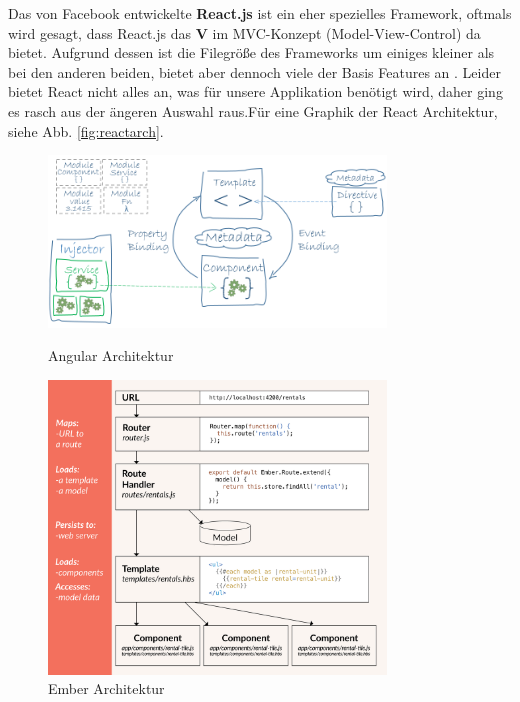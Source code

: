 Das von Facebook entwickelte \textbf{React.js} ist ein eher spezielles Framework, oftmals wird gesagt, dass React.js das \textbf{V} im MVC-Konzept (Model-View-Control) da bietet. Aufgrund dessen ist die Filegröße des Frameworks um einiges kleiner als bei den anderen beiden, bietet aber dennoch viele der Basis Features an \cite{MELD.CH3-web-app.react}. Leider bietet React nicht alles an, was für unsere Applikation benötigt wird, daher ging es rasch aus der ängeren Auswahl raus.Für eine Graphik der React Architektur, siehe Abb. \ref{fig:reactarch}.

\begin{figure}[!tbp]
 	\centering
 	\begin{minipage}[b]{0.8\textwidth}
 		\centering
 		\includegraphics[width=0.8\textwidth]{images/angular}
		\caption{Angular Architektur \cite{MELD.CH3-web-app.angular}}
		\label{fig:angulararch}
 	\end{minipage}
 	\hfill
 	\begin{minipage}[b]{0.8\textwidth}
 		\centering
 		\includegraphics[width=0.8\textwidth]{images/ember}
		\caption{Ember Architektur \cite{MELD.CH3-web-app.ember}}
		\label{fig:emberarch}

\end{minipage}
\end{figure}
